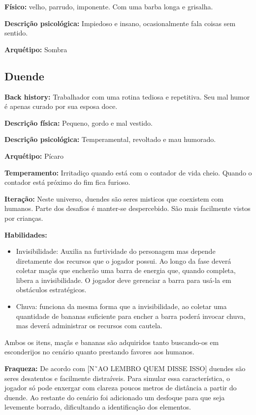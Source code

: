 \textbf{Físico:} velho, parrudo, imponente. Com uma barba longa e grisalha.

\textbf{Descrição psicológica:} Impiedoso e insano, ocasionalmente fala coisas sem sentido.

\textbf{Arquétipo:} Sombra

\subsection{Duende}
\textbf{Back history:} Trabalhador com uma rotina tediosa e repetitiva. Seu mal humor é apenas curado por sua esposa doce.

\textbf{Descrição física:} Pequeno, gordo e mal vestido.

\textbf{Descrição psicológica:} Temperamental, revoltado e mau humorado.

\textbf{Arquétipo:} Pícaro

\textbf{Temperamento:} Irritadiço quando está com o contador de vida cheio. Quando o contador está próximo do fim fica furioso.

\textbf{Iteração: } Neste universo, duendes são seres misticos que coexistem com humanos. Parte dos desafios é manter-se despercebido. São mais facilmente vistos por crianças.

\textbf{Habilidades: }
\begin{itemize}
\item  Invisibilidade: Auxilia na furtividade do personagem mas depende diretamente dos recursos que o jogador possui. Ao longo da fase deverá coletar maçãs que encherão uma barra de energia que, quando completa, libera a invisibilidade. O jogador deve gerenciar a barra para usá-la em obstáculos estratégicos.
\end{itemize}


\begin{itemize}
\item Chuva:  funciona da mesma forma que a invisibilidade, ao coletar uma quantidade de bananas suficiente para encher a barra poderá invocar chuva, mas deverá administrar os recursos com cautela.
\end{itemize}
Ambos os itens, maçãs e bananas são adquiridos tanto buscando-os em esconderijos no cenário quanto prestando favores aos humanos.

\textbf{Fraqueza:} De acordo com [N˜AO LEMBRO QUEM DISSE ISSO] duendes são seres desatentos e facilmente distraíveis. Para simular essa característica, o jogador só pode enxergar com clareza poucos metros de distância a partir do duende. Ao restante do cenário foi adicionado um desfoque para que seja levemente borrado, dificultando a identificação dos elementos.

